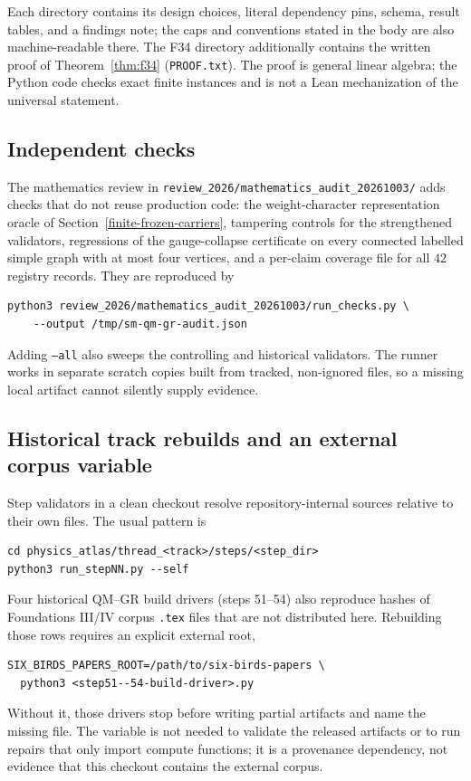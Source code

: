 Each directory contains its design choices, literal dependency pins, schema, result tables, and a findings note; the
caps and conventions stated in the body are also machine-readable there. The F34 directory additionally contains the
written proof of Theorem~\ref{thm:f34} (\nolinkurl{PROOF.txt}). The proof is general linear algebra; the Python code
checks exact finite instances and is not a Lean mechanization of the universal statement.

\subsection{Independent checks}

The mathematics review in \nolinkurl{review_2026/mathematics_audit_20261003/} adds checks that do not reuse
production code: the weight-character representation oracle of Section~\ref{finite-frozen-carriers}, tampering
controls for the strengthened validators, regressions of the gauge-collapse certificate on every connected labelled
simple graph with at most four vertices, and a per-claim coverage file for all \(42\) registry records. They are
reproduced by
\begin{verbatim}
python3 review_2026/mathematics_audit_20261003/run_checks.py \
    --output /tmp/sm-qm-gr-audit.json
\end{verbatim}
Adding \texttt{--all} also sweeps the controlling and historical validators. The runner works in separate scratch
copies built from tracked, non-ignored files, so a missing local artifact cannot silently supply evidence.

\subsection{Historical track rebuilds and an external corpus variable}

Step validators in a clean checkout resolve repository-internal sources relative to their own files. The usual
pattern is
\begin{verbatim}
cd physics_atlas/thread_<track>/steps/<step_dir>
python3 run_stepNN.py --self
\end{verbatim}
Four historical QM--GR build drivers (steps 51--54) also reproduce hashes of Foundations III/IV corpus \texttt{.tex}
files that are not distributed here. Rebuilding those rows requires an explicit external root,
\begin{verbatim}
SIX_BIRDS_PAPERS_ROOT=/path/to/six-birds-papers \
  python3 <step51--54-build-driver>.py
\end{verbatim}
Without it, those drivers stop before writing partial artifacts and name the missing file. The variable is not needed
to validate the released artifacts or to run repairs that only import compute functions; it is a provenance
dependency, not evidence that this checkout contains the external corpus.

